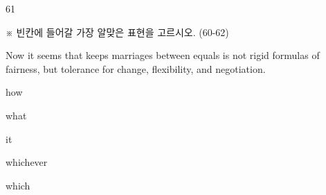 \begin{question}{61}
\begin{framedtext}
※ 빈칸에 들어갈 가장 알맞은 표현을 고르시오. (60-62) \par
\end{framedtext}
Now it seems that \blank{} keeps marriages between equals is not rigid formulas of fairness, but tolerance for change, flexibility, and negotiation.
\begin{choices}
  \item how
  \item what
  \item it
  \item whichever
  \item which
\end{choices}
\end{question}
